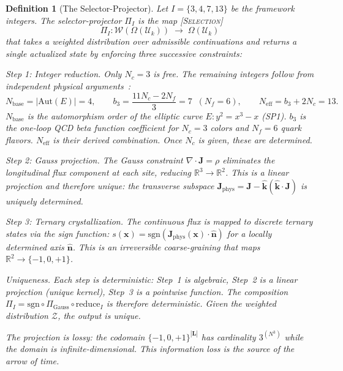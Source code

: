 \documentclass[11pt,a4paper]{article}
\newcommand{\Nc}{N_c}
\newcommand{\Neff}{N_{\mathrm{eff}}}
\newcommand{\RR}{\mathbb{R}}
\newcommand{\UU}{\mathcal{U}}
\newcommand{\OO}{\Omega}
\newcommand{\PP}{\Pi}
\newcommand{\etag}[1]{{\normalfont\textsc{\footnotesize [#1]}}}
\theoremstyle{compact}
\newtheorem{definition}{Definition}
\begin{document}
\begin{definition}[The Selector-Projector]
\label{def:selector}
Let $I = \{3, 4, 7, 13\}$ be the framework integers. The \emph{selector-projector} $\PP_I$ is the map \etag{Selection}
\[
\PP_I: \mathcal{W}(\OO(\UU_k)) \;\longrightarrow\; \OO(\UU_k)
\]
that takes a weighted distribution over admissible continuations and returns a single actualized state by enforcing three successive constraints:

\smallskip
\noindent\textit{Step 1: Integer reduction.} Only $\Nc = 3$ is free. The remaining integers follow from independent physical arguments~\cite{lifecycle}:
\[
N_{\mathrm{base}} = |\mathrm{Aut}(E)| = 4, \qquad b_3 = \frac{11\Nc - 2N_f}{3} = 7 \;\;(N_f = 6), \qquad \Neff = b_3 + 2\Nc = 13.
\]
$N_{\mathrm{base}}$ is the automorphism order of the elliptic curve $E: y^2 = x^3 - x$ (SP1). $b_3$ is the one-loop QCD beta function coefficient for $\Nc = 3$ colors and $N_f = 6$ quark flavors. $\Neff$ is their derived combination. Once $\Nc$ is given, these are determined.

\smallskip
\noindent\textit{Step 2: Gauss projection.} The Gauss constraint $\nabla \cdot \mathbf{J} = \rho$ eliminates the longitudinal flux component at each site, reducing $\RR^3 \to \RR^2$. This is a linear projection and therefore unique: the transverse subspace $\mathbf{J}_{\mathrm{phys}} = \mathbf{J} - \hat{\mathbf{k}}(\hat{\mathbf{k}} \cdot \mathbf{J})$ is uniquely determined.

\smallskip
\noindent\textit{Step 3: Ternary crystallization.} The continuous flux is mapped to discrete ternary states via the sign function: $s(\mathbf{x}) = \mathrm{sgn}(\mathbf{J}_{\mathrm{phys}}(\mathbf{x}) \cdot \hat{\mathbf{n}})$ for a locally determined axis $\hat{\mathbf{n}}$. This is an irreversible coarse-graining that maps $\RR^2 \to \{-1, 0, +1\}$.

\smallskip
\noindent\textit{Uniqueness.} Each step is deterministic: Step~1 is algebraic, Step~2 is a linear projection (unique kernel), Step~3 is a pointwise function. The composition $\PP_I = \mathrm{sgn} \circ \Pi_{\mathrm{Gauss}} \circ \mathrm{reduce}_I$ is therefore deterministic. Given the weighted distribution $\mathcal{Z}$, the output is unique.

The projection is lossy: the codomain $\{-1,0,+1\}^{|\mathbf{L}|}$ has cardinality $3^{(N^3)}$ while the domain is infinite-dimensional. This information loss is the source of the arrow of time.
\end{definition}
\end{document}
